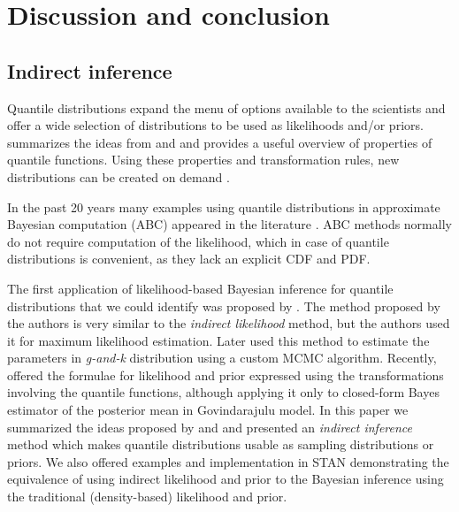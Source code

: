 \documentclass[
  12pt,
]{article}
\begin{document}
\hypertarget{discussion-and-conclusion}{%
\section{Discussion and conclusion}\label{discussion-and-conclusion}}

\hypertarget{indirect-inference}{%
\subsection{Indirect inference}\label{indirect-inference}}

Quantile distributions expand the menu of options available to the scientists and offer a wide selection of distributions to be used as likelihoods and/or priors. \citet{hadlock2017QuantileparameterizedMethodsQuantifying} summarizes the ideas from \citet{gilchrist2000StatisticalModellingQuantilea} and \citet{powley2013QuantileFunctionMethods} and provides a useful overview of properties of quantile functions. Using these properties and transformation rules, new distributions can be created on demand \citep{rodrigues2020FlexibleProcedureFormulating, midhu2014ClassDistributionsLinear, sankaran2016NewQuantileFunction, sankaran2018NewClassQuantile, yang2009QuantileBasedDistributionsModelling, smithson2017CDFquantileDistributionsModelling}.

In the past 20 years many examples using quantile distributions in approximate Bayesian computation (ABC) appeared in the literature \citetext{\citealp{allingham2009BayesianEstimationQuantile}; \citealp{drovandi2011LikelihoodfreeBayesianEstimation}; \citealp{dunson2005ApproximateBayesianInference}; \citealp{mcvinish2012ImprovingABCQuantile}; \citealp[and][]{smithson2017CDFquantileDistributionsModelling}}. ABC methods normally do not require computation of the likelihood, which in case of quantile distributions is convenient, as they lack an explicit CDF and PDF.

The first application of likelihood-based Bayesian inference for quantile distributions that we could identify was proposed by \citet{rayner2002NumericalMaximumLikelihood}. The method proposed by the authors is very similar to the \emph{indirect likelihood} method, but the authors used it for maximum likelihood estimation. Later \citet{haynes2005BayesianEstimationGandk} used this method to estimate the parameters in \emph{g-and-k} distribution using a custom MCMC algorithm. Recently, \citet{nair2020BayesianInferenceQuantile} offered the formulae for likelihood and prior expressed using the transformations involving the quantile functions, although applying it only to closed-form Bayes estimator of the posterior mean in Govindarajulu model. In this paper we summarized the ideas proposed by \citet{rayner2002NumericalMaximumLikelihood} and \citet{nair2020BayesianInferenceQuantile} and presented an \emph{indirect inference} method which makes quantile distributions usable as sampling distributions or priors. We also offered examples and implementation in STAN demonstrating the equivalence of using indirect likelihood and prior to the Bayesian inference using the traditional (density-based) likelihood and prior.
\end{document}
